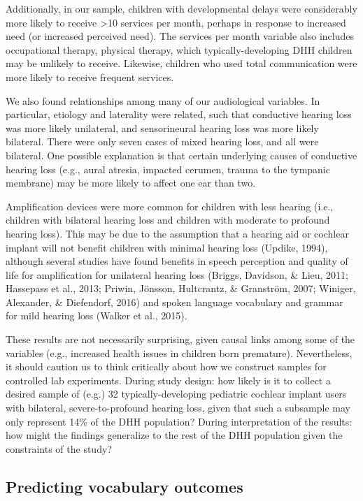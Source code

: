 \documentclass[
  english,
  man]{apa6}
\begin{document}
Additionally, in our sample, children with developmental delays were considerably more likely to receive \textgreater10 services per month, perhaps in response to increased need (or increased perceived need). The services per month variable also includes occupational therapy, physical therapy, which typically-developing DHH children may be unlikely to receive. Likewise, children who used total communication were more likely to receive frequent services.

We also found relationships among many of our audiological variables. In particular, etiology and laterality were related, such that conductive hearing loss was more likely unilateral, and sensorineural hearing loss was more likely bilateral. There were only seven cases of mixed hearing loss, and all were bilateral. One possible explanation is that certain underlying causes of conductive hearing loss (e.g., aural atresia, impacted cerumen, trauma to the tympanic membrane) may be more likely to affect one ear than two.

Amplification devices were more common for children with less hearing (i.e., children with bilateral hearing loss and children with moderate to profound hearing loss). This may be due to the assumption that a hearing aid or cochlear implant will not benefit children with minimal hearing loss (Updike, 1994), although several studies have found benefits in speech perception and quality of life for amplification for unilateral hearing loss (Briggs, Davidson, \& Lieu, 2011; Hassepass et al., 2013; Priwin, Jönsson, Hultcrantz, \& Granström, 2007; Winiger, Alexander, \& Diefendorf, 2016) and spoken language vocabulary and grammar for mild hearing loss (Walker et al., 2015).

These results are not necessarily surprising, given causal links among some of the variables (e.g., increased health issues in children born premature). Nevertheless, it should caution us to think critically about how we construct samples for controlled lab experiments. During study design: how likely is it to collect a desired sample of (e.g.) 32 typically-developing pediatric cochlear implant users with bilateral, severe-to-profound hearing loss, given that such a subsample may only represent 14\% of the DHH population? During interpretation of the results: how might the findings generalize to the rest of the DHH population given the constraints of the study?

\hypertarget{predicting-vocabulary-outcomes}{%
\subsection{Predicting vocabulary outcomes}\label{predicting-vocabulary-outcomes}}
\end{document}
